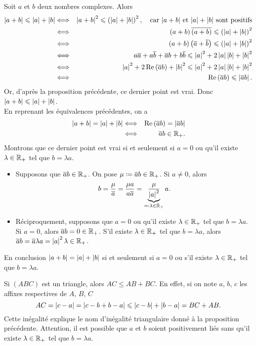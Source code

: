 \documentclass{magnoliaold}
\begin{document}
\begin{preuve}
Soit $a$ et $b$ deux nombres complexes. Alors
\begin{eqnarray*}
\left|a+b\right|\leqslant\left|a\right|+\left|b\right|
&\Longleftrightarrow& \left|a+b\right|^2\leqslant\left(\left|a\right|+\left|b\right|\right)^2, \quad\text{car $\left|a+b\right|$ et $\left|a\right|+\left|b\right|$ sont positifs}\\
&\Longleftrightarrow& \left(a+b\right)\overline{\left(a+b\right)}\leqslant\left(\left|a\right|+\left|b\right|\right)^2\\
&\Longleftrightarrow& \left(a+b\right)\left(\overline{a}+\overline{b}\right)\leqslant\left(\left|a\right|+\left|b\right|\right)^2\\
&\Longleftrightarrow& a\overline{a}+a\overline{b}+\overline{a}b+b\overline{b}\leqslant\left|a\right|^2+2\left|a\right|\left|b\right|+\left|b\right|^2\\
&\Longleftrightarrow& \left|a\right|^2+2\mathop{\rm Re}\left(\overline{a}b\right)+\left|b\right|^2\leqslant\left|a\right|^2+2\left|a\right|\left|b\right|+\left|b\right|^2\\
&\Longleftrightarrow& \mathop{\rm Re}\left(\overline{a}b\right)\leqslant \left|\overline{a}b\right|.
\end{eqnarray*}
Or, d'après la proposition précédente, ce dernier point est vrai. Donc $\left|a+b\right|\leqslant\left|a\right|+\left|b\right|$.\\

En reprenant les équivalences précédentes, on a
\begin{eqnarray*}
\left|a+b\right|=\left|a\right|+\left|b\right|
&\Longleftrightarrow& \mathop{\rm Re}\left(\overline{a}b\right)= \left|\overline{a}b\right|\\
&\Longleftrightarrow& \overline{a}b\in\mathbb{R}_+.
\end{eqnarray*}
Montrons que ce dernier point est vrai si et seulement si $a=0$ ou qu'il existe $\lambda\in\mathbb{R}_+$ tel que $b=\lambda a$.
\begin{itemize}
\item Supposons que $\overline{a}b\in\mathbb{R}_+$. On pose $\mu\coloneqq\overline{a}b\in\mathbb{R}_+$. Si $a\neq 0$, alors
\[b=\frac{\mu}{\overline{a}}=\frac{\mu a}{a\overline{a}}=\underbrace{\frac{\mu}{\left|a\right|^2}}_{\eqqcolon\lambda\in\mathbb{R}_+}a.\]
\item Réciproquement, supposons que $a=0$ ou qu'il existe $\lambda\in\mathbb{R}_+$ tel que $b=\lambda a$. Si $a=0$, alors $\overline{a}b=0\in\mathbb{R}_+$. S'il existe $\lambda\in\mathbb{R}_+$ tel que $b=\lambda a$, alors $\overline{a}b=\overline{a}\lambda a=\left|a\right|^2 \lambda\in\mathbb{R}_+$.
\end{itemize}
En conclusion $\left|a+b\right|=\left|a\right|+\left|b\right|$ si et seulement si $a=0$ ou s'il existe $\lambda\in\mathbb{R}_+$ tel que $b=\lambda a$.
\end{preuve}

\begin{remarques}
\remarque Si $(ABC)$ est un triangle, alors $AC\leq AB+BC$. En effet, si on note $a$, $b$, $c$ les affixes respectives de $A$, $B$, $C$
\[AC=\left|c-a\right|=\left|c-b+b-a\right|\leqslant\left|c-b\right|+\left|b-a\right|=BC+AB.\]
Cette inégalité explique le nom d'inégalité triangulaire donné à la proposition précédente.
\remarque Attention, il est possible que $a$ et $b$ soient positivement liés sans
  qu'il existe $\lambda\in\mathbb{R}_+$ tel que $b=\lambda a$.
\end{remarques}
\end{document}
